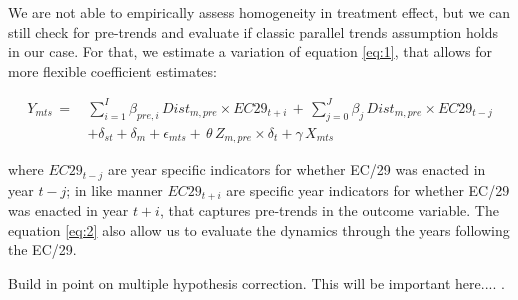 We are not able to empirically assess homogeneity in treatment effect, but we can still check for pre-trends and evaluate if classic parallel trends assumption holds in our case. For that, we estimate a variation of equation \ref{eq:1}, that allows for more flexible coefficient estimates:

\begin{equation} \label{eq:2}
\begin{aligned}
    Y_{mts} \, =  \, & \sum\limits_{i=1}^I \beta_{pre,i} \, Dist_{m,pre} \times EC29_{t+i} \, + \, \sum\limits_{j=0}^J \beta_{j} \, Dist_{m,pre} \times EC29_{t-j} \\  
             & +  \delta_{st} + \delta_m + \epsilon_{mts} + \, \theta \, Z_{m,pre} \times \delta_{t} + \gamma \, X_{mts}
\end{aligned}
\end{equation}

where $EC29_{t-j}$ are year specific indicators for whether EC/29 was enacted in year $t-j$; in like manner $EC29_{t+i}$ are specific year indicators for whether EC/29 was enacted in year $t+i$, that captures pre-trends in the outcome variable. The equation \ref{eq:2} also allow us to evaluate the dynamics through the years following the EC/29. 

Build in point on multiple hypothesis correction.  This will be important here....  \citet{RomanoWolf2005,Anderson2008}.







